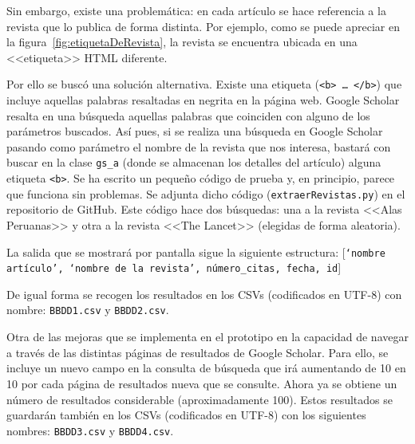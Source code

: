 
Sin embargo, existe una problemática: en cada artículo se hace referencia a la revista que lo publica de forma distinta. Por ejemplo, como se puede apreciar en la figura~\ref{fig:etiquetaDeRevista}, la revista se encuentra ubicada en una <<etiqueta>> HTML diferente.


Por ello se buscó una solución alternativa.
Existe una etiqueta (\texttt{<b> … </b>}) que incluye aquellas palabras resaltadas en negrita en la página web. Google Scholar resalta en una búsqueda aquellas palabras que coinciden con alguno de los parámetros buscados. Así pues, si se realiza una búsqueda en Google Scholar pasando como parámetro el nombre de la revista que nos interesa, bastará con buscar en la clase  \texttt{gs\_a} (donde se almacenan los detalles del artículo) alguna etiqueta \texttt{<b>}.
Se ha escrito un pequeño código de prueba y, en principio, parece que funciona sin problemas. Se adjunta dicho código (\texttt{extraerRevistas.py}) en el repositorio de GitHub. %
Este código hace dos búsquedas: una a la revista <<Alas Peruanas>> y otra a la revista <<The Lancet>> (elegidas de forma aleatoria).



La salida que se mostrará por pantalla sigue la siguiente estructura: [\texttt{‘nombre artículo’, ‘nombre de la revista’, número\_citas, fecha, id}]

De igual forma se recogen los resultados en los CSVs (codificados en UTF-8) con nombre: \texttt{BBDD1.csv} y \texttt{BBDD2.csv}.



Otra de las mejoras que se implementa en el prototipo en la capacidad de navegar a través de las distintas páginas de resultados de Google Scholar. Para ello, se incluye un nuevo campo en la consulta de búsqueda que irá aumentando de 10 en 10 por cada página de resultados nueva que se consulte.
Ahora ya se obtiene un número de resultados considerable (aproximadamente 100). Estos resultados se guardarán también en los CSVs (codificados en UTF-8) con los siguientes nombres: \texttt{BBDD3.csv} y \texttt{BBDD4.csv}.

